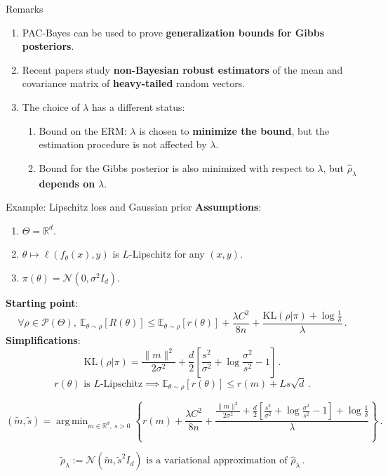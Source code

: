 \documentclass[aspectratio=159]{beamer}
\DeclareMathOperator*{\argmin}{arg\,min}
\begin{document}
    \begin{frame}{Remarks}
        \begin{enumerate}[<+->]
            \item PAC-Bayes can be used to prove \textbf{generalization bounds for Gibbs posteriors}.
            \item  Recent papers study \textbf{non-Bayesian robust estimators} of the mean and covariance matrix of \textbf{heavy-tailed} random vectors.
            \item The choice of \(\lambda\) has a different status:
            \begin{enumerate}
                \item Bound on the ERM: \(\lambda\) is chosen to \textbf{minimize the bound}, but the estimation procedure is not affected by \(\lambda\).
                \item Bound for the Gibbs posterior is also minimized with respect to \(\lambda\), but \(\hat{\rho}_\lambda\) \textbf{depends on} \(\lambda\).
            \end{enumerate}
        \end{enumerate}
        
    \end{frame}

    \begin{frame}{Example: Lipschitz loss and Gaussian prior}
        \textbf{Assumptions}:
        \begin{enumerate}
            \item \(\Theta = \mathbb{R}^d\).
            \item \(\theta \mapsto \ell(f_\theta(x), y)\) is \(L\)-Lipschitz for any \((x, y)\).
            \item \(\pi(\theta) = \mathcal{N}(0, \sigma^2 I_d)\).
        \end{enumerate}
        \pause
        \textbf{Starting point}:
        \[
            \forall \rho \in \mathcal{P}(\Theta), \ \mathbb{E}_{\theta \sim \rho}[R(\theta)] \leq \mathbb{E}_{\theta \sim \rho}[r(\theta)] + \frac{\lambda C^2}{8n} + \frac{\text{KL}(\rho|\pi) + \log\tfrac{1}{\delta}}{\lambda}\,.
        \]
        \pause
        \textbf{Simplifications}:
        \[
            \text{KL}(\rho|\pi) = \frac{\|m\|^2}{2\sigma ^2} + \frac{d}{2}\left[ \frac{s^2}{\sigma^2} + \log \frac{\sigma ^2}{s^2} - 1 \right]\,.
        \]
        \[
            r(\theta) \text{ is } L\text{-Lipschitz}\implies \mathbb{E}_{\theta \sim \rho}[r(\theta)] \leq r(m) + Ls\sqrt{d}\,.
        \]
    \end{frame}
    \begin{frame}
        \[
        (\tilde{m}, \tilde{s}) = \argmin_{m\in \mathbb{R} ^d, \ s > 0} \left\{ r(m) + \frac{\lambda C^2}{8n} + \frac{\frac{\|m\|^2}{2\sigma^2} + \frac{d}{2}\left[ \frac{s^2}{\sigma^2} + \log \frac{\sigma^2}{s^2} - 1 \right] + \log \frac{1}{\delta}}{\lambda}\right\}\,.
        \]
        
        \[
        \tilde{\rho}_\lambda := \mathcal{N}(\tilde{m}, \tilde{s}^2I_d) \text{ is a variational approximation of } \hat{\rho}_\lambda\,.
        \]
    \end{frame}
\end{document}

